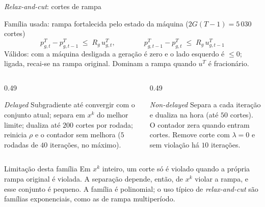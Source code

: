 \documentclass[10pt,aspectratio=169]{beamer}
\newcommand{\pT}{p^{T}}
\newcommand{\uT}{u^{T}}
\newcommand{\displaycompacto}{%
  \setlength{\abovedisplayskip}{2pt}%
  \setlength{\belowdisplayskip}{2pt}%
  \setlength{\abovedisplayshortskip}{2pt}%
  \setlength{\belowdisplayshortskip}{2pt}%
}
\begin{document}
\begin{frame}{\emph{Relax-and-cut}: cortes de rampa}
  \footnotesize
  \displaycompacto
  \begin{block}{Família usada: rampa fortalecida pelo estado da máquina ($2G(T-1) = 5\,030$ cortes)}
    \[
      \pT_{g,t} - \pT_{g,t-1} \;\le\; R_g\, \uT_{g,t},
      \qquad\qquad
      \pT_{g,t-1} - \pT_{g,t} \;\le\; R_g\, \uT_{g,t-1}
    \]
    \scriptsize
    Válidos: com a máquina desligada a geração é zero e o lado esquerdo é $\le 0$;
    ligada, recai-se na rampa original. Dominam a rampa quando $\uT$ é fracionário.
  \end{block}

  \begin{columns}[T]
    \begin{column}{0.49\textwidth}
      \begin{block}{\emph{Delayed}}
        \scriptsize
        Subgradiente até convergir com o conjunto atual; separa em $x^k$ do melhor
        limite; dualiza até $200$ cortes por rodada; reinicia $\rho$ e o contador
        sem melhora ($5$ rodadas de $40$ iterações, no máximo).
      \end{block}
    \end{column}
    \begin{column}{0.49\textwidth}
      \begin{block}{\emph{Non-delayed}}
        \scriptsize
        Separa a cada iteração e dualiza na hora (até $50$ cortes). O contador zera
        quando entram cortes. Remove corte com $\lambda = 0$ e sem violação há $10$
        iterações.
      \end{block}
    \end{column}
  \end{columns}

  \vspace{0.3em}
  \begin{alertblock}{Limitação desta família}
    \scriptsize
    Em $x^k$ inteiro, um corte só é violado quando a própria rampa original é violada.
    A separação depende, então, de $x^k$ violar a rampa, e esse conjunto é pequeno.
    A família é polinomial; o uso típico de \emph{relax-and-cut} são famílias
    exponenciais, como as de rampa multiperíodo.
  \end{alertblock}
\end{frame}
\end{document}
